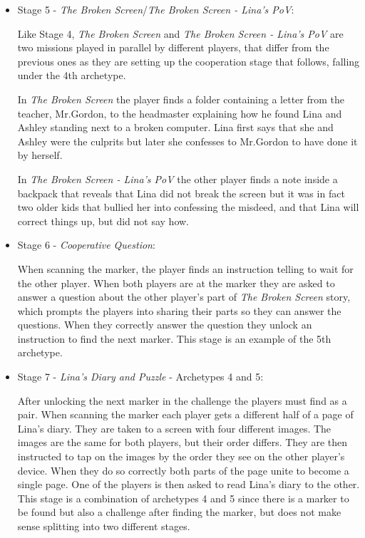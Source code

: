 \begin{itemize}
	\item Stage 5 - \textit{The Broken Screen}/\textit{The Broken Screen - Lina's PoV}: 
	\par Like Stage 4, \textit{The Broken Screen} and \textit{The Broken Screen - Lina's PoV} are two missions played in parallel by different players, that differ from the previous ones as they are setting up the cooperation stage that follows, falling under the 4th archetype. \par In \textit{The Broken Screen} the player finds a folder containing a letter from the teacher, Mr.Gordon, to the headmaster explaining how he found Lina and Ashley standing next to a broken computer. Lina first says that she and Ashley were the culprits but later she confesses to Mr.Gordon to have done it by herself.
	\par In \textit{The Broken Screen - Lina's PoV} the other player finds a note inside a backpack that reveals that Lina did not break the screen but it was in fact two older kids that bullied her into confessing the misdeed, and that Lina will correct things up, but did not say how.
	
	\item Stage 6 - \textit{Cooperative Question}: 
	\par When scanning the marker, the player finds an instruction telling to wait for the other player. When both players are at the marker they are asked to answer a question about the other player's part of \textit{The Broken Screen} story, which prompts the players into sharing their parts so they can answer the questions. When they correctly answer the question they unlock an instruction to find the next marker. This stage is an example of the 5th archetype.

    
	
	\item Stage 7 - \textit{Lina's Diary and Puzzle} - Archetypes 4 and 5:
	\par After unlocking the next marker in the challenge the players must find as a pair. When scanning the marker each player gets a different half of a page of Lina's diary. They are taken to a screen with four different images. The images are the same for both players, but their order differs. They are then instructed to tap on the images by the order they see on the other player's device. When they do so correctly both parts of the page unite to become a single page. One of the players is then asked to read Lina's diary to the other. This stage is a combination of archetypes 4 and 5 since there is a marker to be found but also a challenge after finding the marker, but does not make sense splitting into two different stages. 
	
	
\end{itemize}


